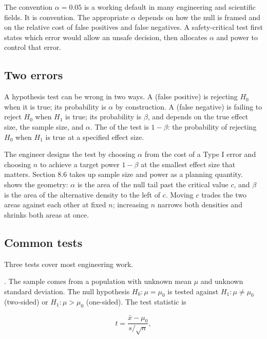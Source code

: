 The convention $\alpha = 0.05$ is a working default in many
engineering and scientific fields. It is convention. The appropriate
$\alpha$ depends on how the null is framed and on the relative cost
of false positives and false negatives. A safety-critical test first
states which error would allow an unsafe decision, then allocates
$\alpha$ and power to control that error.

\subsection{Two errors}

A hypothesis test can be wrong in two ways. A  (false positive) is rejecting $H_{0}$ when it is true; its
probability is $\alpha$ by construction. A 
(false negative) is failing to reject $H_{0}$ when $H_{1}$ is true;
its probability is $\beta$, and depends on the true effect size, the
sample size, and $\alpha$. The  of the test is
$1 - \beta$: the probability of rejecting $H_{0}$ when $H_{1}$ is
true at a specified effect size.

The engineer designs the test by choosing $\alpha$ from the cost of
a Type I error and choosing $n$ to achieve a target power $1 - \beta$
at the smallest effect size that matters. Section 8.6 takes up
sample size and power as a planning quantity.
 shows the geometry: $\alpha$
is the area of the null tail past the critical value $c$, and
$\beta$ is the area of the alternative density to the left of $c$.
Moving $c$ trades the two areas against each other at fixed $n$;
increasing $n$ narrows both densities and shrinks both areas at
once.



\subsection{Common tests}

Three tests cover most engineering work.

. The sample comes from a population with
unknown mean $\mu$ and unknown standard deviation. The null
hypothesis $H_{0}: \mu = \mu_{0}$ is tested against $H_{1}: \mu \neq
\mu_{0}$ (two-sided) or $H_{1}: \mu > \mu_{0}$ (one-sided). The test
statistic is

\[
t = \frac{\bar{x} - \mu_{0}}{s/\sqrt{n}},
\]

